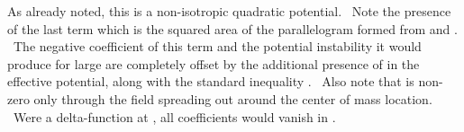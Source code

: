 \documentclass[a4paper,12pt]{article}%
\begin{document}
As already noted, this is a non-isotropic quadratic potential. \ Note the
presence of the last term \coordHE{} which is the squared area of the
parallelogram formed from \coordHE{} and \coordHE{}. \ The negative coefficient of this term
and the potential instability it would produce for large \coordHE{} are
completely offset by the additional presence of \coordHE{} in the
effective potential, along with the standard inequality \coordHE{}. \ Also
note that \coordHE{} is non-zero only through the field spreading out around the
center of mass location. \ Were \coordHE{}
a delta-function at \coordHE{}, all coefficients would vanish in \coordHE{}.
\end{document}
